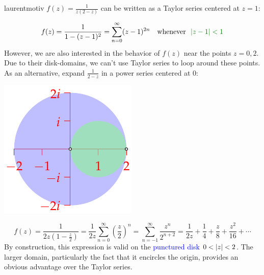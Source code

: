 \begin{example}{}{laurentmotiv}
	$f(z)=\frac 1{z(2-z)}$ can be written as a Taylor series centered at $z=1$:\par
	\begin{minipage}[t]{0.7\linewidth}\vspace{-10pt}
		\[
			f(z)=\frac 1{1-(z-1)^2} 
			=\sum_{n=0}^\infty (z-1)^{2n}
			\quad\text{whenever \ \textcolor{Green}{$\nm{z-1}<1$}}
		\]
		However, we are also interested in the behavior of $f(z)$ near the points $z=0,2$. Due to their disk-domains, we can't use Taylor series to loop around these points.\smallbreak
		As an alternative, expand $\frac 1{2-z}$ in a power series centered at 0:
	\end{minipage}
	\hfill
	\begin{minipage}[t]{0.29\linewidth}\vspace{-10pt}
		\flushright\includegraphics[scale=0.95]{laurent}
	\end{minipage}\par\vspace{-10pt}
	\[
		f(z)=\frac 1{2z(1-\frac{z}{2})}
		=\frac 1{2z}\sum_{n=0}^\infty\left(\frac z2\right)^n 
		=\sum_{n=-1}^\infty\frac{z^n}{2^{n+2}} 
		=\frac 1{2z}+\frac 14+\frac z8+\frac{z^2}{16}+\cdots
	\]
	By construction, this expression is valid on the \textcolor{blue}{punctured disk $0<\left| z\right|<2$}. The larger domain, particularly the fact that it encircles the origin, provides an obvious advantage over the Taylor series. 
\end{example}


